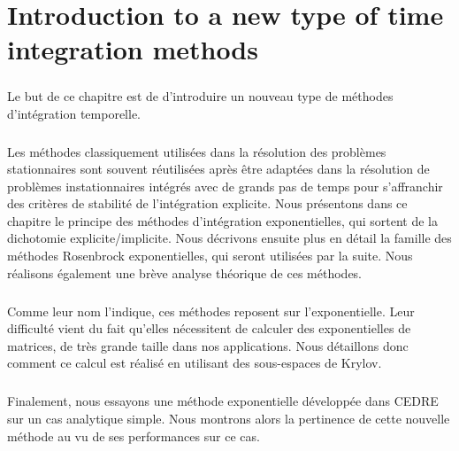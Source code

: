 \chapter{Introduction to a new type of time integration methods}

\begin{tcolorbox}[title=Résumé du chapitre : Introduction d'un nouveau type de méthodes d'intégration temporelle, colframe=black!50!white]
  \paragraph{}
  Le but de ce chapitre est de d'introduire un nouveau type de méthodes d'intégration temporelle.

  \paragraph{}
  Les méthodes classiquement utilisées dans la résolution des problèmes stationnaires sont souvent réutilisées après être adaptées dans la résolution de problèmes instationnaires intégrés avec de grands pas de temps pour s'affranchir des critères de stabilité de l'intégration explicite.
  Nous présentons dans ce chapitre le principe des méthodes d'intégration exponentielles, qui sortent de la dichotomie explicite/implicite.
  Nous décrivons ensuite plus en détail la famille des méthodes Rosenbrock exponentielles, qui seront utilisées par la suite.
  Nous réalisons également une brève analyse théorique de ces méthodes.

  \paragraph{}
  Comme leur nom l'indique, ces méthodes reposent sur l'exponentielle.
  Leur difficulté vient du fait qu'elles nécessitent de calculer des exponentielles de matrices, de très grande taille dans nos applications.
  Nous détaillons donc comment ce calcul est réalisé en utilisant des sous-espaces de Krylov.

  \paragraph{}
  Finalement, nous essayons une méthode exponentielle développée dans CEDRE sur un cas analytique simple.
  Nous montrons alors la pertinence de cette nouvelle méthode au vu de ses performances sur ce cas.
\end{tcolorbox}


